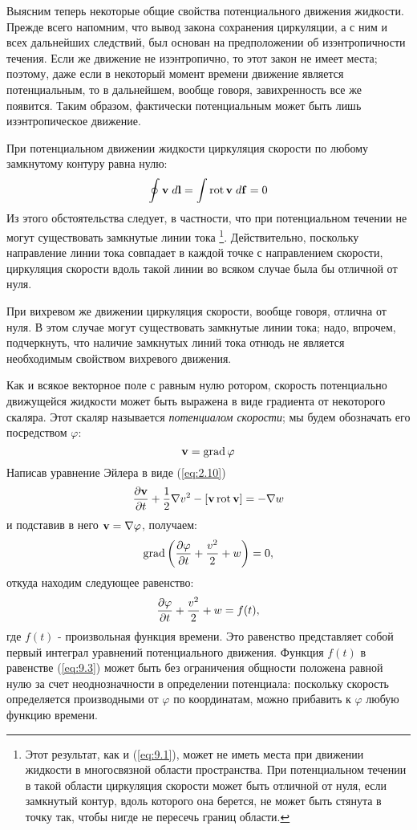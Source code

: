 Выясним теперь некоторые общие свойства потенциального движения жидкости. Прежде
всего напомним, что вывод закона сохранения циркуляции, а с ним и всех
дальнейших следствий, был основан на предположении об изэнтропичности течения.
Если же движение не изэнтропично, то этот закон не имеет места; поэтому, даже
если в некоторый момент времени движение является потенциальным, то в
дальнейшем, вообще говоря, завихренность все же появится. Таким образом,
фактически потенциальным может быть лишь изэнтропическое движение.

При потенциальном движении жидкости циркуляция скорости по любому замкнутому
контуру равна нулю:
\begin{equation}
   \label{eq:9.1}
   \oint { \mathbf{v} }\;d\mathbf{l} = \int \mathop{\mathrm{rot}}\nolimits { \mathbf{v} } \; d\mathbf{f} = 0
\end{equation}
Из этого обстоятельства следует, в частности, что при потенциальном течении не
могут существовать замкнутые линии тока \footnote{Этот результат, как и (\ref{eq:9.1}),
может не иметь места при движении жидкости в многосвязной области пространства.
При потенциальном течении в такой области циркуляция скорости может быть отличной
от нуля, если замкнутый контур, вдоль которого она берется, не может быть стянута
в точку так, чтобы нигде не пересечь границ области.}. Действительно, поскольку направление
линии тока совпадает в каждой точке с направлением скорости, циркуляция скорости
вдоль такой линии во всяком случае была бы отличной от нуля.

При вихревом же движении циркуляция скорости, вообще говоря, отлична от нуля. В
этом случае могут существовать замкнутые линии тока; надо, впрочем, подчеркнуть,
что наличие замкнутых линий тока отнюдь не является необходимым свойством
вихревого движения.

Как и всякое векторное поле с равным нулю ротором, скорость потенциально
движущейся жидкости может быть выражена в виде градиента от некоторого скаляра.
Этот скаляр называется \textit{потенциалом скорости}; мы будем обозначать его
посредством $\varphi$:
\begin{equation}
   \label{eq:9.2}
   { \mathbf{v} } = \mathop{\mathrm{grad}}\nolimits \varphi
\end{equation}
Написав уравнение Эйлера в виде (\ref{eq:2.10})
\[
   \frac{\partial{{ \mathbf{v} }}}{\partial{t}} + \frac{1}{2}\nabla v^2 - \lbrack { \mathbf{v} } \mathop{\mathrm{rot}}\nolimits { \mathbf{v} } \rbrack = - \nabla w
\]
и подставив в него ${\mathbf{v}} = \nabla \varphi$, получаем:
\[
   \mathop{\mathrm{grad}}\nolimits \left( \frac{\partial{\varphi}}{\partial{t}} + \frac{v^2}{2} + w \right) = 0,
\]
откуда находим следующее равенство:
\begin{equation}
   \label{eq:9.3}
   \frac{\partial{\varphi}}{\partial{t}} + \frac{v^2}{2} + w = f(t),
\end{equation}
где $f(t)$ - произвольная функция времени. Это равенство представляет собой
первый интеграл уравнений потенциального движения. Функция $f(t)$ в равенстве
(\ref{eq:9.3}) может быть без ограничения общности положена равной нулю за счет
неоднозначности в определении потенциала: поскольку скорость определяется
производными от $\varphi$ по координатам, можно прибавить к $\varphi$ любую
функцию времени.

